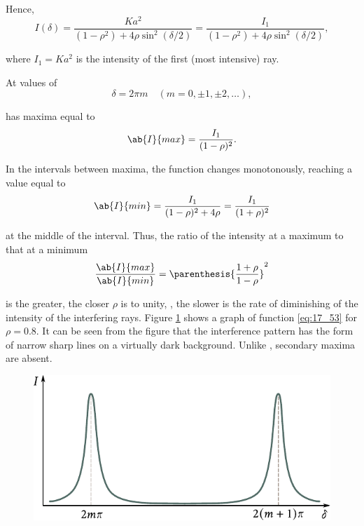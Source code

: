 \noindent
Hence,
\begin{equation}\label{eq:17_53}
    I(\delta) = \frac{Ka^2}{(1-\rho^2) + 4\rho\sin^2(\delta/2)} = \frac{I_1}{(1-\rho^2) + 4\rho\sin^2(\delta/2)},
\end{equation}

\noindent
where $I_1=Ka^2$ is the intensity of the first (most intensive) ray.

At values of
\begin{equation}\label{eq:17_54}
    \delta = 2 \pi m \quad (m = 0, \pm 1, \pm 2, \ldots),
\end{equation}

\noindent
{} has maxima equal to
\begin{equation}\label{eq:17_55}
    \ab{I}{max} = \frac{I_1}{(1-\rho)^2}.
\end{equation}

\noindent
In the intervals between maxima, the function changes monotonously, reaching a value equal to
\begin{equation}\label{eq:17_56}
    \ab{I}{min} = \frac{I_1}{(1-\rho)^2 + 4\rho} = \frac{I_1}{(1+\rho)^2}
\end{equation}

\noindent
at the middle of the interval.
Thus, the ratio of the intensity at a maximum to that at a minimum
\begin{equation}\label{eq:17_57}
    \frac{\ab{I}{max}}{\ab{I}{min}} = \parenthesis{\frac{1+\rho}{1-\rho}}^2
\end{equation}

\noindent
is the greater, the closer $\rho$ is to unity, \ie, the slower is the rate of diminishing of the intensity of the interfering rays.
Figure \ref{fig:17_19} shows a graph of function \eqref{eq:17_53} for $\rho=0.8$.
It can be seen from the figure that the interference pattern has the form of narrow sharp
lines on a virtually dark background.
Unlike , secondary maxima are absent.

\begin{figure}[!htb]
	\begin{center}
		\includegraphics[scale=0.95]{figures/ch_17/fig_17_19.pdf}
		\caption[]{}
		\label{fig:17_19}
	\end{center}
	\vspace{-0.85cm}
\end{figure}

